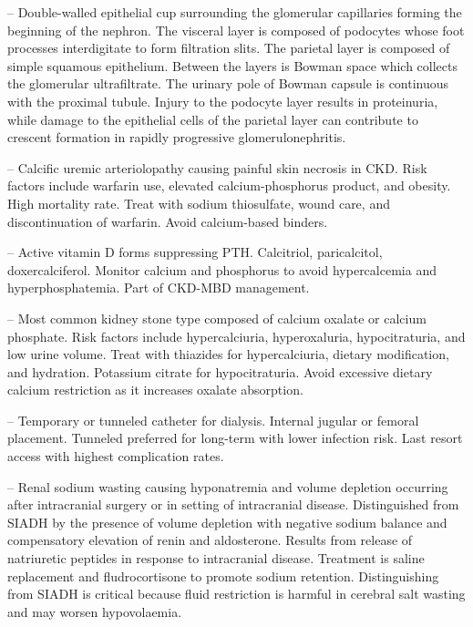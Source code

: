 -- Double-walled epithelial cup surrounding the glomerular capillaries forming the beginning of the nephron. The visceral layer is composed of podocytes whose foot processes interdigitate to form filtration slits. The parietal layer is composed of simple squamous epithelium. Between the layers is Bowman space which collects the glomerular ultrafiltrate. The urinary pole of Bowman capsule is continuous with the proximal tubule. Injury to the podocyte layer results in proteinuria, while damage to the epithelial cells of the parietal layer can contribute to crescent formation in rapidly progressive glomerulonephritis.

-- Calcific uremic arteriolopathy causing painful skin necrosis in CKD. Risk factors include warfarin use, elevated calcium-phosphorus product, and obesity. High mortality rate. Treat with sodium thiosulfate, wound care, and discontinuation of warfarin. Avoid calcium-based binders.

-- Active vitamin D forms suppressing PTH. Calcitriol, paricalcitol, doxercalciferol. Monitor calcium and phosphorus to avoid hypercalcemia and hyperphosphatemia. Part of CKD-MBD management.

-- Most common kidney stone type composed of calcium oxalate or calcium phosphate. Risk factors include hypercalciuria, hyperoxaluria, hypocitraturia, and low urine volume. Treat with thiazides for hypercalciuria, dietary modification, and hydration. Potassium citrate for hypocitraturia. Avoid excessive dietary calcium restriction as it increases oxalate absorption.

-- Temporary or tunneled catheter for dialysis. Internal jugular or femoral placement. Tunneled preferred for long-term with lower infection risk. Last resort access with highest complication rates.

-- Renal sodium wasting causing hyponatremia and volume depletion occurring after intracranial surgery or in setting of intracranial disease. Distinguished from SIADH by the presence of volume depletion with negative sodium balance and compensatory elevation of renin and aldosterone. Results from release of natriuretic peptides in response to intracranial disease. Treatment is saline replacement and fludrocortisone to promote sodium retention. Distinguishing from SIADH is critical because fluid restriction is harmful in cerebral salt wasting and may worsen hypovolaemia.

